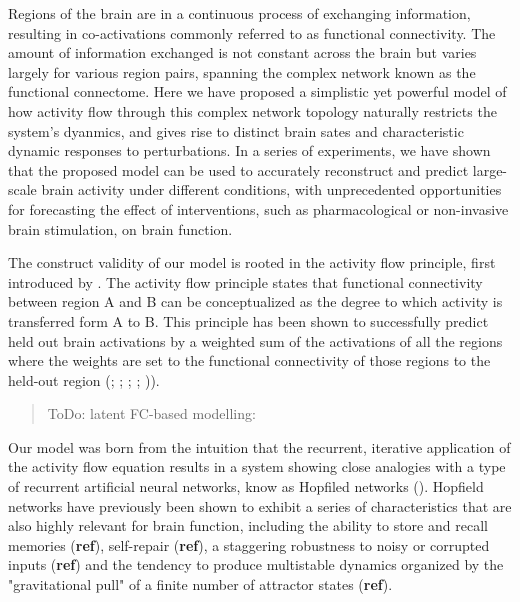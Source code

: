 \documentclass{article}
\begin{document}
Regions of the brain are in a continuous process of exchanging information, resulting in co-activations commonly referred to as functional connectivity.
The amount of information exchanged is not constant across the brain but varies largely for various region pairs, spanning the complex network known as the functional connectome.
Here we have proposed a simplistic yet powerful model of how activity flow through this complex network topology naturally restricts the system's dyanmics, and gives rise to distinct brain sates and characteristic dynamic responses to perturbations.
In a series of experiments, we have shown that the proposed model can be used to accurately reconstruct and predict large-scale brain activity under different conditions, with unprecedented opportunities for forecasting the effect of interventions, such as pharmacological or non-invasive brain stimulation, on brain function.

The construct validity of our model is rooted in the activity flow principle, first introduced by \href{https://doi.org/10.1038/nn.4406}{}. The activity flow principle states that functional connectivity between region A and B can be conceptualized as the degree to which activity is transferred form A to B. This principle has been shown to successfully predict held out brain activations by a weighted sum of the activations of all the regions where the weights are set to the functional connectivity of those regions to the held-out region (\href{https://doi.org/10.1038/nn.4406}{}; \href{https://doi.org/10.1038/s41467-017-01000-w}{}; \cite{Mill_2022}; \cite{Hearne_2021}; \cite{Chen_2018})).

\begin{quote}
ToDo: latent FC-based modelling: \href{https://doi.org/10.1162/netn\_a\_00234}{}
\end{quote}

Our model was born from the intuition that the recurrent, iterative application of the activity flow equation results in a system showing close analogies with a type of recurrent artificial neural networks, know as Hopfiled networks (\href{https://doi.org/10.1073/pnas.79.8.2554}{}).
Hopfield networks have previously been shown to exhibit a series of characteristics that are also highly relevant for brain function, including the ability to store and recall memories (\textbf{ref}), self-repair (\textbf{ref}), a staggering robustness to noisy or corrupted inputs (\textbf{ref}) and the tendency to produce multistable dynamics organized by the "gravitational pull" of a finite number of attractor states (\textbf{ref}).
\end{document}
